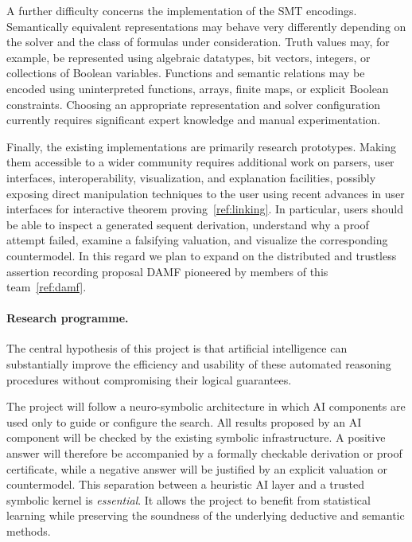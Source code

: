 \documentclass[a4paper]{article}
\begin{document}
A further difficulty concerns the implementation of the SMT encodings. Semantically equivalent representations may behave very differently depending on the solver and the class of formulas under consideration. Truth values may, for example, be represented using algebraic datatypes, bit vectors, integers, or collections of Boolean variables. Functions and semantic relations may be encoded using uninterpreted functions, arrays, finite maps, or explicit Boolean constraints. Choosing an appropriate representation and solver configuration currently requires significant expert knowledge and manual experimentation.

Finally, the existing implementations are primarily research prototypes. Making them accessible to a wider community requires additional work on parsers, user interfaces, interoperability, visualization, and explanation facilities, possibly exposing direct manipulation techniques to the user using recent advances in user interfaces for interactive theorem proving~\ref{ref:linking}. In particular, users should be able to inspect a generated sequent derivation, understand why a proof attempt failed, examine a falsifying valuation, and visualize the corresponding countermodel. In this regard we plan to expand on the distributed and trustless assertion recording proposal DAMF pioneered by members of this team~\ref{ref:damf}.

\paragraph{Research programme.}
The central hypothesis of this project is that artificial intelligence can substantially improve the efficiency and usability of these automated reasoning procedures without compromising their logical guarantees.

The project will follow a neuro-symbolic architecture in which AI components are used only to guide or configure the search. All results proposed by an AI component will be checked by the existing symbolic infrastructure. A positive answer will therefore be accompanied by a formally checkable derivation or proof certificate, while a negative answer will be justified by an explicit valuation or countermodel.
%
This separation between a heuristic AI layer and a trusted symbolic kernel is {\em essential}. It allows the project to benefit from statistical learning while preserving the soundness of the underlying deductive and semantic methods.
\end{document}
